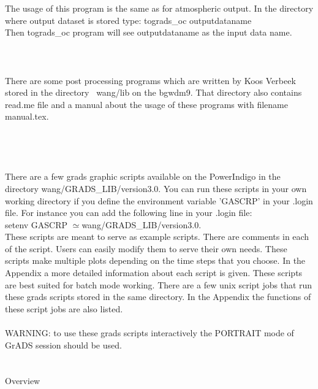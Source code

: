 The usage of this program is the same as for atmospheric output.
In the directory where output dataset is stored type:
tograds\_oc outputdataname \\
Then tograds\_oc program will see outputdataname as the input data name.
\\
\\
\\
\\
There are some post processing programs which are written by Koos Verbeek stored in the directory
~wang/lib on the bgwdm9. That directory also contains read.me file and a manual about the usage of these 
programs with filename manual.tex. \\
\newpage
{}\\  \\
\\
\\
There are a few grads graphic scripts available on the PowerIndigo in the
directory wang/GRADS\_LIB/version3.0. You can run these scripts in your own
working directory if you define the environment variable 'GASCRP' in your .login file.
For instance you can add the following line in your .login file: \\
setenv GASCRP $\simeq$wang/GRADS\_LIB/version3.0. \\
These scripts are meant to serve as example scripts. There are comments in 
each of the script. Users can easily modify them to serve their own needs. 
These scripts make multiple
plots depending on the time steps that you choose. In the Appendix a more
detailed information about each script is given.
These scripts are best suited for batch mode working. There are a few unix script jobs that
run these grads scripts stored in the same directory. In the Appendix the functions 
of these script jobs are also listed.
\\
\\
WARNING: to use these grads scripts interactively the PORTRAIT mode of GrADS session should be used.
\\
\\
\\
\noindent Overview \\
\\ 
